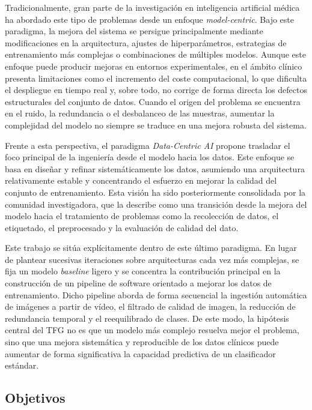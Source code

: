 ﻿\documentclass[10pt,a4paper,twocolumn,twoside]{article}
\begin{document}
Tradicionalmente, gran parte de la investigación en inteligencia artificial médica ha abordado este tipo de problemas desde un enfoque \textit{model-centric}. Bajo este paradigma, la mejora del sistema se persigue principalmente mediante modificaciones en la arquitectura, ajustes de hiperparámetros, estrategias de entrenamiento más complejas o combinaciones de múltiples modelos. Aunque este enfoque puede producir mejoras en entornos experimentales, en el ámbito clínico presenta limitaciones como el incremento del coste computacional, lo que dificulta el despliegue en tiempo real y, sobre todo, no corrige de forma directa los defectos estructurales del conjunto de datos. Cuando el origen del problema se encuentra en el ruido, la redundancia o el desbalanceo de las muestras, aumentar la complejidad del modelo no siempre se traduce en una mejora robusta del sistema.\cite{zha2025datacentric}

Frente a esta perspectiva, el paradigma \textit{Data-Centric AI} propone trasladar el foco principal de la ingeniería desde el modelo hacia los datos. Este enfoque se basa en diseñar y refinar sistemáticamente los datos, asumiendo una arquitectura relativamente estable y concentrando el esfuerzo en mejorar la calidad del conjunto de entrenamiento.\cite{ng_datacentric} Esta visión ha sido posteriormente consolidada por la comunidad investigadora, que la describe como una transición desde la mejora del modelo hacia el tratamiento de problemas como la recolección de datos, el etiquetado, el preprocesado y la evaluación de calidad del dato.\cite{zha2025datacentric}

Este trabajo se sitúa explícitamente dentro de este último paradigma. En lugar de plantear sucesivas iteraciones sobre arquitecturas cada vez más complejas, se fija un modelo \textit{baseline} ligero y se concentra la contribución principal en la construcción de un pipeline de software orientado a mejorar los datos de entrenamiento. Dicho pipeline aborda de forma secuencial la ingestión automática de imágenes a partir de vídeo, el filtrado de calidad de imagen, la reducción de redundancia temporal y el reequilibrado de clases. De este modo, la hipótesis central del TFG no es que un modelo más complejo resuelva mejor el problema, sino que una mejora sistemática y reproducible de los datos clínicos puede aumentar de forma significativa la capacidad predictiva de un clasificador estándar.\cite{zha2025datacentric, ng_datacentric}

\subsection{Objetivos}
\end{document}
